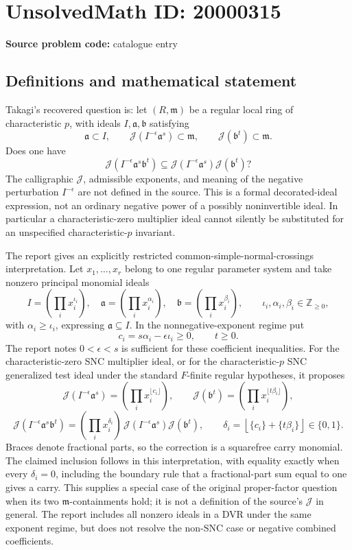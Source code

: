 \documentclass[11pt]{article}
\newcommand{\Z}{\mathbb{Z}}
\begin{document}
\section*{UnsolvedMath ID: 20000315}
\textbf{Source problem code:} catalogue entry
\subsection{Definitions and mathematical statement}
Takagi's recovered question is: let \((R,\mathfrak m)\) be a regular local ring of characteristic \(p\), with ideals \(I,\mathfrak a,\mathfrak b\) satisfying
\[
\mathfrak a\subset I,\qquad
\mathcal J(I^{-\epsilon}\mathfrak a^s)\subset\mathfrak m,\qquad
\mathcal J(\mathfrak b^t)\subset\mathfrak m.
\]
Does one have
\[
\mathcal J(I^{-\epsilon}\mathfrak a^s\mathfrak b^t)
\subseteq\mathcal J(I^{-\epsilon}\mathfrak a^s)\mathcal J(\mathfrak b^t)?
\]
The calligraphic \(\mathcal J\), admissible exponents, and meaning of the negative perturbation \(I^{-\epsilon}\) are not defined in the source. This is a formal decorated-ideal expression, not an ordinary negative power of a possibly noninvertible ideal. In particular a characteristic-zero multiplier ideal cannot silently be substituted for an unspecified characteristic-\(p\) invariant.

The report gives an explicitly restricted common-simple-normal-crossings interpretation. Let \(x_1,\ldots,x_r\) belong to one regular parameter system and take nonzero principal monomial ideals
\[
I=(\prod_i x_i^{\iota_i}),\quad
\mathfrak a=(\prod_i x_i^{\alpha_i}),\quad
\mathfrak b=(\prod_i x_i^{\beta_i}),
\qquad \iota_i,\alpha_i,\beta_i\in\Z_{\geq0},
\]
with \(\alpha_i\geq\iota_i\), expressing \(\mathfrak a\subseteq I\). In the nonnegative-exponent regime put
\[
c_i=s\alpha_i-\epsilon\iota_i\geq0,\qquad t\geq0.
\]
The report notes \(0<\epsilon<s\) is sufficient for these coefficient inequalities. For the characteristic-zero SNC multiplier ideal, or for the characteristic-\(p\) SNC generalized test ideal under the standard \(F\)-finite regular hypotheses, it proposes
\[
\mathcal J(I^{-\epsilon}\mathfrak a^s)
=(\prod_i x_i^{\lfloor c_i\rfloor}),\qquad
\mathcal J(\mathfrak b^t)=(\prod_i x_i^{\lfloor t\beta_i\rfloor}),
\]
\[
\mathcal J(I^{-\epsilon}\mathfrak a^s\mathfrak b^t)
=(\prod_i x_i^{\delta_i})\,
\mathcal J(I^{-\epsilon}\mathfrak a^s)\mathcal J(\mathfrak b^t),
\qquad
\delta_i=\left\lfloor\{c_i\}+\{t\beta_i\}\right\rfloor\in\{0,1\}.
\]
Braces denote fractional parts, so the correction is a squarefree carry monomial. The claimed inclusion follows in this interpretation, with equality exactly when every \(\delta_i=0\), including the boundary rule that a fractional-part sum equal to one gives a carry. This supplies a special case of the original proper-factor question when its two \(\mathfrak m\)-containments hold; it is not a definition of the source's \(\mathcal J\) in general. The report includes all nonzero ideals in a DVR under the same exponent regime, but does not resolve the non-SNC case or negative combined coefficients.
\end{document}
